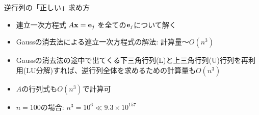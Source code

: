 \begin{frame}[t,fragile]{逆行列の「正しい」求め方}
  \begin{itemize}
    \setlength{\itemsep}{1em}
  \item 連立一次方程式 $A {\bf x} = {\bf e}_j$ を全ての${\bf e}_j$について解く
  \item Gaussの消去法による連立一次方程式の解法: 計算量〜$O(n^3)$
  \item Gaussの消去法の途中で出てくる下三角行列(L)と上三角行列(U)行列を再利用(LU分解)すれば、逆行列全体を求めるための計算量も$O(n^3)$
  \item $A$の行列式も$O(n^3)$で計算可
  \item $n=100$の場合: $n^3 = 10^6 \ll 9.3 \times 10^{157}$
  \end{itemize}
\end{frame}
